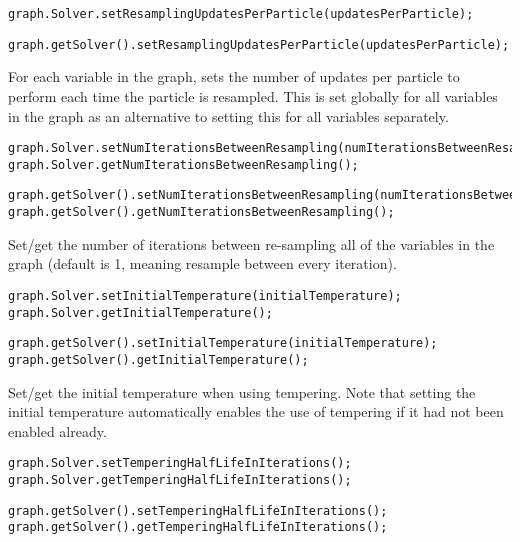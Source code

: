 \ifmatlab
\begin{lstlisting}
graph.Solver.setResamplingUpdatesPerParticle(updatesPerParticle);
\end{lstlisting}
\fi

\ifjava
\begin{lstlisting}
graph.getSolver().setResamplingUpdatesPerParticle(updatesPerParticle);
\end{lstlisting}
\fi

For each variable in the graph, sets the number of updates per particle to perform each time the particle is resampled. This is set globally for all variables in the graph as an alternative to setting this for all variables separately.

\ifmatlab
\begin{lstlisting}
graph.Solver.setNumIterationsBetweenResampling(numIterationsBetweenResampling);
graph.Solver.getNumIterationsBetweenResampling();
\end{lstlisting}
\fi

\ifjava
\begin{lstlisting}
graph.getSolver().setNumIterationsBetweenResampling(numIterationsBetweenResampling);
graph.getSolver().getNumIterationsBetweenResampling();
\end{lstlisting}
\fi

Set/get the number of iterations between re-sampling all of the variables in the graph (default is 1, meaning resample between every iteration).

\ifmatlab
\begin{lstlisting}
graph.Solver.setInitialTemperature(initialTemperature);
graph.Solver.getInitialTemperature();
\end{lstlisting}
\fi

\ifjava
\begin{lstlisting}
graph.getSolver().setInitialTemperature(initialTemperature);
graph.getSolver().getInitialTemperature();
\end{lstlisting}
\fi


Set/get the initial temperature when using tempering. Note that setting the initial temperature automatically enables the use of tempering if it had not been enabled already.

\ifmatlab
\begin{lstlisting}
graph.Solver.setTemperingHalfLifeInIterations();
graph.Solver.getTemperingHalfLifeInIterations();
\end{lstlisting}
\fi

\ifjava
\begin{lstlisting}
graph.getSolver().setTemperingHalfLifeInIterations();
graph.getSolver().getTemperingHalfLifeInIterations();
\end{lstlisting}
\fi

